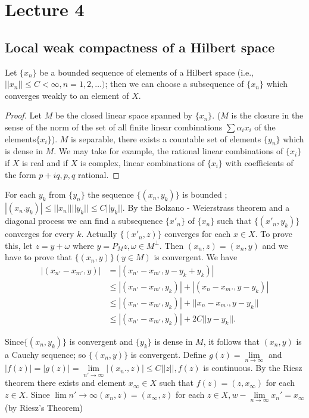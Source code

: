 \chapter{Lecture 4}\label{chap4}

\section{Local weak compactness of a Hilbert space}\label{chap4:sec1}\pageoriginale

\begin{theorem*}
 Let $\{x_n\}$ be a bounded sequence of elements of a Hilbert space
 (i.e., $|| x_n || \leq C < \infty, n = 1, 2, \ldots )$; then we
 can choose a subsequence of $\{x_n\}$ which converges weakly to an
 element of $X$. 
\end{theorem*}

\begin{proof}
 Let $M$ be the closed linear space spanned by $\{x_n \}$. ($M$ is
 the closure in the sense of the norm of the set of all finite
 linear combinations $\sum \alpha_i x_i$ of the
 elements$\{x_i\}$). $M$ is separable, there exists a countable set
 of elements $\{y_n\}$ which is dense in $M$. We may take for example,
 the rational linear combinations of $\{ x_i \}$ if $X$ is real 
 and if $X$ is complex, linear combinations of $\{x_i\}$ with
 coefficients of the form $p + iq, p,q$ rational. 
\end{proof}

For each $y_k$ from $\{y_n\}$ the sequence $\big\{(x_n, y_k)\big\}$
is bounded ; $|(x_n. y_k)| \leq ||x_n|| || y_k || \leq C || y_k ||
$. By the Bolzano - Weierstrass theorem and a diagonal process we can
find a subsequence $\{x'_n\}$ of $\{x_n\}$ such that $\big\{(x'_n,
y_k)\big\}$ converges for every $k$. Actually $\{(x'_n, z)\}$
converges for each $x \in X$. To prove this, let $z = y + \omega$
where $y = P_M z, \omega \in M^\perp$. Then $(x_n, z ) = (x_n, y)$
and we have to prove that $\{(x_n, y )\} (y \in M)$ is convergent. We
have 
\begin{align*}
 |(x_{n'} - x_{m'}, y )| & = |(x_{n'} - x_{m'}, y - y_k + y_k)|\\
 & \leq |(x_{n'} - x_{m'}, y_k)| + |(x_n - x_m., y - y_k )|\\
 & \leq |(x_{n'} - x_{m'}, y_k)| + || x_n - x_m ., y - y_k ||\\
 & \leq |(x_{n'} - x_{m'}, y_k)| + 2C||y-y_k||.
\end{align*}

Since\pageoriginale $\{(x_n, y_k)\}$ is convergent and $\{y_k\}$ is dense in $M$,
it follows that $(x_n, y)$ is a Cauchy sequence; so $\{(x_n, y)\}$
is convergent. Define $g(z) = \lim\limits_{ n \to \infty}$ and $|f(z)|
= |g(z)| = \lim\limits_{ n' \to \infty} | (x_n ., z)| \leq C || z||,
f(z)$ is continuous. By the Riesz theorem there exists and element
$x_\infty \in X$ such that $f(z) = (z, x_\infty)$ for each $z \in
X$. Since $\lim\limits{n '\to \infty} (x_n, z) = (x_\infty, z )$ for
each $z \in X, w - \lim\limits_{ n \to \infty} x_n' = x_\infty $ (by
Riesz's Theorem)  

